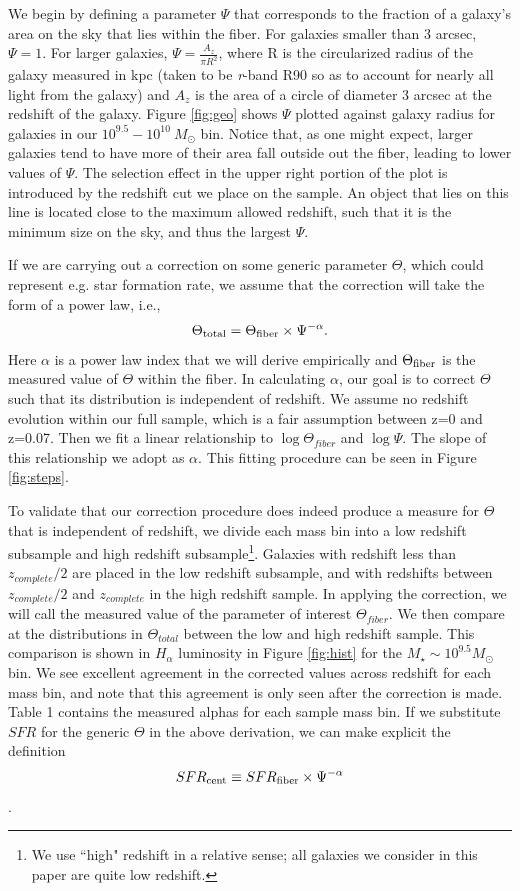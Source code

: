 \documentclass[iop]{emulateapj}
\begin{document}
We begin by defining a parameter $\Psi$ that corresponds to the fraction of a galaxy's area on the sky that lies within the fiber. For galaxies smaller than 3 arcsec, $\Psi = 1$. For larger galaxies, $\Psi = \frac{A_z}{\pi R^2}$, where R is the circularized radius of the galaxy measured in kpc (taken to be \textit{r}-band R90 so as to account for nearly all light from the galaxy) and $A_z$ is the area of a circle of diameter 3 arcsec at the redshift of the galaxy. Figure \ref{fig:geo} shows $\Psi$ plotted against galaxy radius for galaxies in our $10^{9.5}-10^{10}\ M_{\odot}$ bin. Notice that, as one might expect, larger galaxies tend to have more of their area fall outside out the fiber, leading to lower values of $\Psi$. The selection effect in the upper right portion of the plot is introduced by the redshift cut we place on the sample. An object that lies on this line is located close to the maximum allowed redshift, such that it is the minimum size on the sky, and thus the largest $\Psi$. 

If we are carrying out a correction on some generic parameter $\Theta$, which could represent e.g. star formation rate, we assume that the correction will take the form of a power law, i.e., $$\Theta_{\rm total} = \Theta_{\rm fiber} \times \Psi^{-\alpha}.$$ Here $\alpha$ is a power law index that we will derive empirically and $\Theta_{\rm fiber}$ is the measured value of $\Theta$ within the fiber. In calculating $\alpha$, our goal is to correct $\Theta$ such that its distribution is independent of redshift. We assume no redshift evolution within our full sample, which is a fair assumption between z=0 and z=0.07. Then we fit a linear relationship to $\log \Theta_{fiber}$ and $\log \Psi$. The slope of this relationship we adopt as $\alpha$. This fitting procedure can be seen in Figure \ref{fig:steps}.

To validate that our correction procedure does indeed produce a measure for $\Theta$ that is independent of redshift, we divide each mass bin into a low redshift subsample and high redshift subsample\footnote{We use ``high" redshift in a relative sense; all galaxies we consider in this paper are quite low redshift.}. Galaxies with redshift less than $z_{complete}/2$ are placed in the low redshift subsample, and with redshifts between $z_{complete}/2$ and  $z_{complete}$ in the high redshift sample. In applying the correction, we will call the measured value of the parameter of interest $\Theta_{fiber}$. We then compare at the distributions in $\Theta_{total}$ between the low and high redshift sample. This comparison is shown in $H_\alpha$ luminosity in Figure \ref{fig:hist} for the $M_\star \sim 10^{9.5} M_{\odot}$ bin. We see excellent agreement in the corrected values across redshift for each mass bin, and note that this agreement is only seen after the correction is made. Table 1  contains the measured alphas for each sample mass bin. If we substitute $SFR$ for the generic $\Theta$ in the above derivation, we can make explicit the definition $$SFR_{\rm cent} \equiv SFR_{\rm fiber} \times \Psi^{-\alpha}$$.
\end{document}
